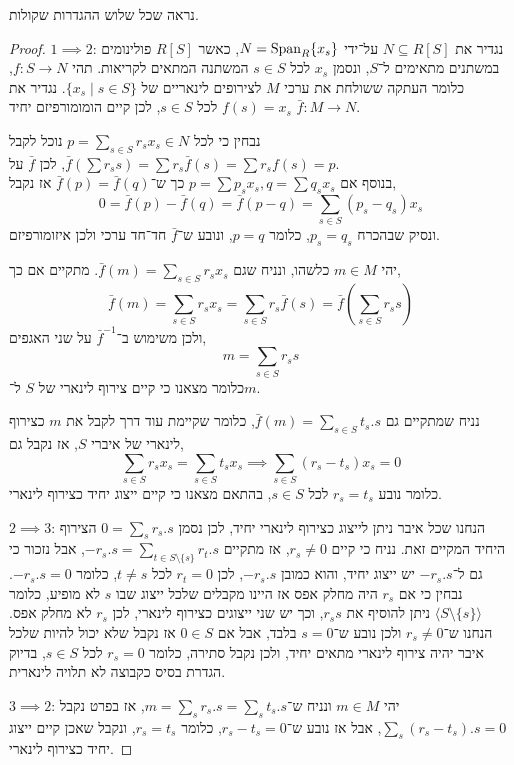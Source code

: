 \subquestion{}
נראה שכל שלוש ההגדרות שקולות.
\begin{proof}
	$1 \implies 2$:
	נגדיר את $N \subseteq R[S]$ על־ידי $N = \operatorname{Span}_R\{ x_s \}$, כאשר $R[S]$ פולינומים במשתנים מתאימים ל־$S$, ונסמן $x_s$ לכל $s \in S$ המשתנה המתאים לקריאות.
	תהי $f : S \to N$, כלומר העתקה ששולחת את ערכי $M$ לצירופים לינאריים של $\{ x_s \mid s \in S \}$.
	נגדיר את $f(s) = x_s$ לכל $s \in S$, לכן קיים הומומורפיזם יחיד $\bar{f} : M \to N$.

	נבחין כי לכל $p = \sum_{s \in S} r_s x_s \in N$ נוכל לקבל $\bar{f}(\sum r_s s) = \sum r_s \bar{f}(s) = \sum r_s f(s) = p$, לכן $\bar{f}$ על. \\
	בנוסף אם $p = \sum p_s x_s, q = \sum q_s x_s$ כך ש־$\bar{f}(p) = \bar{f}(q)$ אז נקבל,
	\[
		0
		= \bar{f}(p) - \bar{f}(q)
		= \bar{f}(p - q)
		= \sum_{s \in S} (p_s - q_s) x_s
	\]
	ונסיק שבהכרח $p_s = q_s$, כלומר $p = q$, ונובע ש־$\bar{f}$ חד־חד ערכי ולכן איזומורפיזם.

	יהי $m \in M$ כלשהו, ונניח שגם $\bar{f}(m) = \sum_{s \in S} r_s x_s$.
	מתקיים אם כך,
	\[
		\bar{f}(m)
		= \sum_{s \in S} r_s x_s
		= \sum_{s \in S} r_s \bar{f}(s)
		= \bar{f}(\sum_{s \in S} r_s s)
	\]
	ולכן משימוש ב־$\bar{f}^{-1}$ על שני האגפים,
	\[
		m
		= \sum_{s \in S} r_s s
	\]
	כלומר מצאנו כי קיים צירוף לינארי של $S$ ל־$m$.

	נניח שמתקיים גם $\bar{f}(m) = \sum_{s \in S} t_s . s$, כלומר שקיימת עוד דרך לקבל את $m$ כצירוף לינארי של איברי $S$, אז נקבל גם,
	\[
		\sum_{s \in S} r_s x_s
		= \sum_{s \in S} t_s x_s
		\implies
		\sum_{s \in S} (r_s - t_s) x_s
		= 0
	\]
	כלומר נובע $r_s = t_s$ לכל $s \in S$, בהתאם מצאנו כי קיים ייצוג יחיד כצירוף לינארי.

	$2 \implies 3$:
	הנחנו שכל איבר ניתן לייצוג כצירוף לינארי יחיד, לכן נסמן $0 = \sum_s r_s . s$ הצירוף היחיד המקיים זאת.
	נניח כי קיים $r_s \ne 0$, אז מתקיים $-r_s . s = \sum_{t \in S \setminus \{ s \}} r_t . s$, אבל נזכור כי גם ל־$-r_s . s$ יש ייצוג יחיד, והוא כמובן $-r_s . s$, לכן $r_t = 0$ לכל $t \ne s$, כלומר $-r_s . s = 0$.
	נבחין כי אם $r_s$ היה מחלק אפס אז היינו מקבלים שלכל ייצוג שבו $s$ לא מופיע, כלומר $\langle S \setminus \{ s \} \rangle$ ניתן להוסיף את $r_s s$, וכך יש שני ייצוגים כצירוף לינארי, לכן $r_s$ לא מחלק אפס.
	הנחנו ש־$r_s \ne 0$ ולכן נובע ש־$s = 0$ בלבד, אבל אם $0 \in S$ אז נקבל שלא יכול להיות שלכל איבר יהיה צירוף לינארי מתאים יחיד, ולכן נקבל סתירה, כלומר $r_s = 0$ לכל $s \in S$, בדיוק הגדרת בסיס כקבוצה לא תלויה לינארית.

	$3 \implies 2$:
	יהי $m \in M$ ונניח ש־$m = \sum_s r_s . s = \sum_s t_s . s$, אז בפרט נקבל $\sum_s (r_s - t_s) . s = 0$, אבל אז נובע ש־$r_s - t_s = 0$, כלומר $r_s = t_s$, ונקבל שאכן קיים ייצוג יחיד כצירוף לינארי.


\end{proof}
